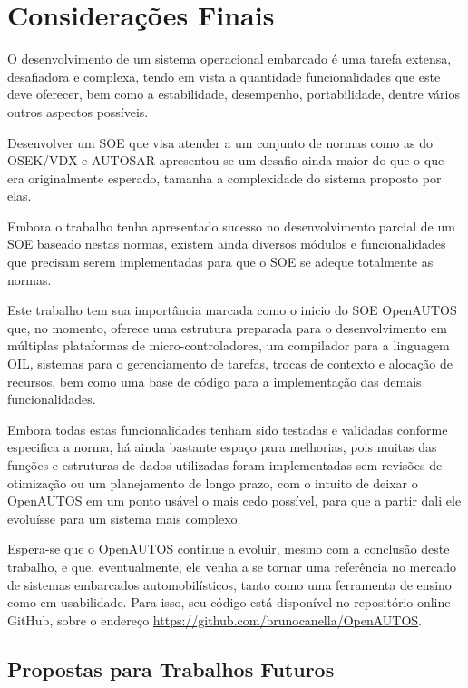 \chapter{Considerações Finais}

O desenvolvimento de um sistema operacional embarcado é uma tarefa extensa, desafiadora e complexa, tendo em vista a quantidade funcionalidades que este deve oferecer, bem como a estabilidade, desempenho, portabilidade, dentre vários outros aspectos possíveis.

Desenvolver um SOE que visa atender a um conjunto de normas como as do OSEK/VDX e AUTOSAR apresentou-se um desafio ainda maior do que o que era originalmente esperado, tamanha a complexidade do sistema proposto por elas.

Embora o trabalho tenha apresentado sucesso no desenvolvimento parcial de um SOE baseado nestas normas, existem ainda diversos módulos e funcionalidades que precisam serem implementadas para que o SOE se adeque totalmente as normas.

Este trabalho tem sua importância marcada como o inicio do SOE OpenAUTOS que, no momento, oferece uma estrutura preparada para o desenvolvimento em múltiplas plataformas de micro-controladores, um compilador para a linguagem OIL, sistemas para o gerenciamento de tarefas, trocas de contexto e alocação de recursos, bem como uma base de código para a implementação das demais funcionalidades.

Embora todas estas funcionalidades tenham sido testadas e validadas conforme especifica a norma, há ainda bastante espaço para melhorias, pois muitas das funções e estruturas de dados utilizadas foram implementadas sem revisões de otimização ou um planejamento de longo prazo, com o intuito de deixar o OpenAUTOS em um ponto usável o mais cedo possível, para que a partir dali ele evoluísse para um sistema mais complexo.

Espera-se que o OpenAUTOS continue a evoluir, mesmo com a conclusão deste trabalho, e que, eventualmente, ele venha a se tornar uma referência no mercado de sistemas embarcados automobilísticos, tanto como uma ferramenta de ensino como em usabilidade. Para isso, seu código está disponível no repositório online GitHub, sobre o endereço \url{https://github.com/brunocanella/OpenAUTOS}.

\section{Propostas para Trabalhos Futuros}


